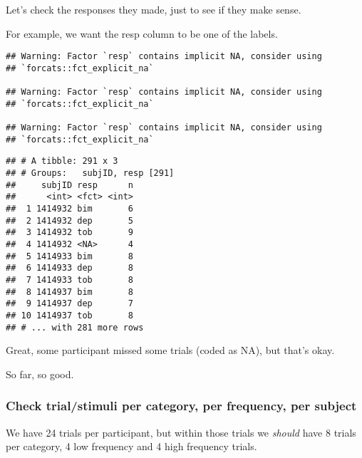 \documentclass[
]{article}
\newenvironment{Shaded}{\begin{snugshade}}{\end{snugshade}}
\newcommand{\KeywordTok}[1]{\textcolor[rgb]{0.13,0.29,0.53}{\textbf{#1}}}
\newcommand{\NormalTok}[1]{#1}
\newcommand{\OperatorTok}[1]{\textcolor[rgb]{0.81,0.36,0.00}{\textbf{#1}}}
\newcommand{\StringTok}[1]{\textcolor[rgb]{0.31,0.60,0.02}{#1}}
\begin{document}
Let's check the responses they made, just to see if they make sense.

For example, we want the resp column to be one of the labels.

\begin{Shaded}
\end{Shaded}

\begin{verbatim}
## Warning: Factor `resp` contains implicit NA, consider using
## `forcats::fct_explicit_na`

## Warning: Factor `resp` contains implicit NA, consider using
## `forcats::fct_explicit_na`

## Warning: Factor `resp` contains implicit NA, consider using
## `forcats::fct_explicit_na`
\end{verbatim}

\begin{verbatim}
## # A tibble: 291 x 3
## # Groups:   subjID, resp [291]
##     subjID resp      n
##      <int> <fct> <int>
##  1 1414932 bim       6
##  2 1414932 dep       5
##  3 1414932 tob       9
##  4 1414932 <NA>      4
##  5 1414933 bim       8
##  6 1414933 dep       8
##  7 1414933 tob       8
##  8 1414937 bim       8
##  9 1414937 dep       7
## 10 1414937 tob       8
## # ... with 281 more rows
\end{verbatim}

Great, some participant missed some trials (coded as NA), but that's
okay.

So far, so good.

\hypertarget{check-trialstimuli-per-category-per-frequency-per-subject}{%
\subsubsection{Check trial/stimuli per category, per frequency, per
subject}\label{check-trialstimuli-per-category-per-frequency-per-subject}}

We have 24 trials per participant, but within those trials we
\emph{should} have 8 trials per category, 4 low frequency and 4 high
frequency trials.

\begin{Shaded}
\end{Shaded}
\end{document}
